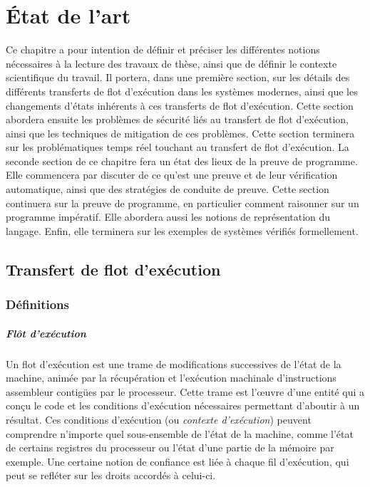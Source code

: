 \chapter{État de l'art}

	Ce chapitre a pour intention de définir et préciser les différentes notions nécessaires à la lecture des travaux de thèse, ainsi que de définir le contexte scientifique du travail. Il portera, dans une première section, sur les détails des différents transferts de flot d'exécution dans les systèmes modernes, ainsi que les changements d'états inhérents à ces transferts de flot d'exécution. Cette section abordera ensuite les problèmes de sécurité liés au transfert de flot d'exécution, ainsi que les techniques de mitigation de ces problèmes. Cette section terminera sur les problématiques temps réel touchant au transfert de flot d'exécution.
	La seconde section de ce chapitre fera un état des lieux de la preuve de programme. Elle commencera par discuter de ce qu'est une preuve et de leur vérification automatique, ainsi que des stratégies de conduite de preuve. Cette section continuera sur la preuve de programme, en particulier comment raisonner sur un programme impératif. Elle abordera aussi les notions de représentation du langage. Enfin, elle terminera sur les exemples de systèmes vérifiés formellement.

	\section{Transfert de flot d'exécution}
	\label{control_flow_transfer}

		\subsection{Définitions}

		\paragraph{Flôt d'exécution}

\label{context}
			Un flot d'exécution est une trame de modifications successives de l'état de la machine, animée par la récupération et l'exécution machinale d'instructions assembleur contigües par le processeur. Cette trame est l'œuvre d'une entité qui a conçu le code et les conditions d'exécution nécessaires permettant d'aboutir à un résultat. Ces conditions d'exécution (ou \emph{contexte d'exécution}) peuvent comprendre n'importe quel sous-ensemble de l'état de la machine, comme l'état de certains registres du processeur ou l'état d'une partie de la mémoire par exemple. Une certaine notion de confiance est liée à chaque fil d'exécution, qui peut se refléter sur les droits accordés à celui-ci.

